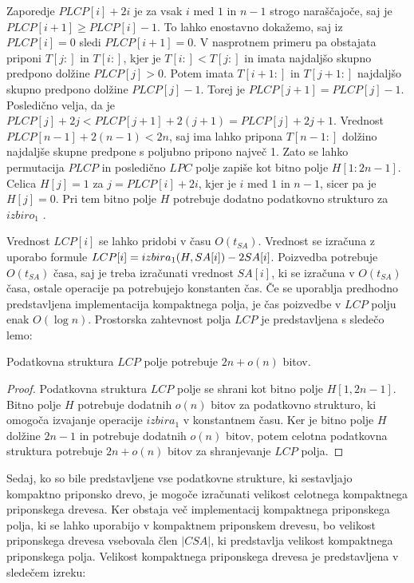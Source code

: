 Zaporedje $PLCP[i]+2i$ je za vsak $i$ med $1$ in $n-1$ strogo naraščajoče, saj je $PLCP[i+1]\ge PLCP[i]-1$. To lahko enostavno dokažemo, saj iz $PLCP[i]=0$ sledi $PLCP[i+1]=0$. V nasprotnem primeru pa obstajata priponi $T[j:]$ in $T[i:]$, kjer je $T[i:]<T[j:]$ in imata najdaljšo skupno predpono dolžine $PLCP[j]>0$. Potem imata $T[i+1:]$ in $T[j+1:]$ najdaljšo skupno predpono dolžine $PLCP[j]-1$. Torej je $PLCP[j+1] = PLCP[j]-1$. Posledično velja, da je $PLCP[j]+2j<PLCP[j+1]+2(j+1)= PLCP[j]+2j+1$. Vrednost $PLCP[n-1]+2(n-1)< 2n$, saj ima lahko pripona $T[n-1:]$ dolžino najdaljše skupne predpone s poljubno pripono največ 1. Zato se lahko permutacija $PLCP$ in posledično $LPC$ polje zapiše kot bitno polje $H[1:2n-1]$. Celica $H[j]=1$ za $j=PLCP[i]+2i$, kjer je $i$ med $1$ in $n-1$, sicer pa je $H[j]=0$. Pri tem bitno polje $H$ potrebuje dodatno podatkovno strukturo za $izbiro_1$ \cite{Navarro2016, Sadakane2007}.

Vrednost $LCP[i]$ se lahko pridobi v času $O(t_{SA})$. Vrednost se izračuna z uporabo formule $LCP[i]= \mathop{izbira}\nolimits_{1}(H,SA[i])-2SA[i]$. Poizvedba potrebuje $O(t_{SA})$ časa, saj je treba izračunati vrednost $SA[i]$, ki se izračuna v $O(t_{SA})$ časa, ostale operacije pa potrebujejo konstanten čas. Če se uporablja predhodno predstavljena implementacija kompaktnega polja, je čas poizvedbe v $LCP$ polju enak $O(\log{n})$. Prostorska zahtevnost polja $LCP$ je predstavljena s sledečo lemo:

\begin{lema}\label{lema:LCP}
 Podatkovna struktura $LCP$ polje potrebuje $2n+o(n)$ bitov.
\end{lema}

\begin{proof}
    Podatkovna struktura $LCP$ polje se shrani kot bitno polje $H[1,2n-1]$. Bitno polje $H$ potrebuje dodatnih $o(n)$ bitov za podatkovno strukturo, ki omogoča izvajanje operacije $izbira_1$ v konstantnem času. Ker je bitno polje $H$ dolžine $2n-1$ in potrebuje dodatnih $o(n)$ bitov, potem celotna podatkovna struktura potrebuje $2n+o(n)$ bitov za shranjevanje $LCP$ polja.
\end{proof}

Sedaj, ko so bile predstavljene vse podatkovne strukture, ki sestavljajo kompaktno priponsko drevo, je mogoče izračunati velikost celotnega kompaktnega priponskega drevesa. Ker obstaja več implementacij kompaktnega priponskega polja, ki se lahko uporabijo v kompaktnem priponskem drevesu, bo velikost priponskega drevesa vsebovala člen $|CSA|$, ki predstavlja velikost kompaktnega priponskega polja. Velikost kompaktnega priponskega drevesa je predstavljena v sledečem izreku:

